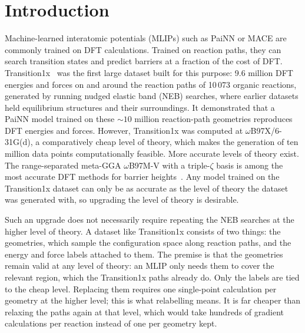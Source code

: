 \chapter{Introduction}
\label{ch:introduction}


Machine-learned interatomic potentials (MLIPs) such as PaiNN or MACE
are commonly trained on DFT calculations. Trained on reaction paths,
they can search transition states and predict barriers at a fraction
of the cost of DFT. Transition1x~\cite{schreiner2022} was the first
large dataset built for this purpose: 9.6 million DFT energies and
forces on and around the reaction paths of 10\,073 organic reactions,
generated by running nudged elastic band (NEB) searches, where earlier
datasets held equilibrium structures and their surroundings. It demonstrated that a PaiNN model trained on these
${\sim}10$ million reaction-path geometries reproduces DFT energies
and forces. However,
Transition1x was computed at \mbox{$\omega$B97X/6-31G(d)}, a
comparatively cheap level of theory, which makes the generation of
ten million data points computationally feasible. More accurate
levels of theory exist. The range-separated
meta-GGA $\omega$B97M-V with a triple-$\zeta$ basis is among the most
accurate DFT methods for barrier heights~\cite{mardirossian2016,
najibi2018}. Any model trained on the Transition1x dataset can only
be as accurate as the level of theory the dataset was generated with,
so upgrading the level of theory is desirable.

Such an upgrade does not necessarily require repeating the NEB searches at the
higher level of theory. A dataset like Transition1x consists of two
things: the geometries, which sample the configuration space along
reaction paths, and the energy and force labels attached to them. The
premise is that the geometries remain valid at any level of theory:
an MLIP only needs them to cover the relevant region, which the
Transition1x paths already do. Only the labels are tied to the cheap
level. Replacing them requires one single-point calculation per geometry at
the higher level; this is what relabelling means. It is far cheaper
than relaxing the paths again at that level, which would take hundreds
of gradient calculations per reaction instead of one per geometry
kept.

